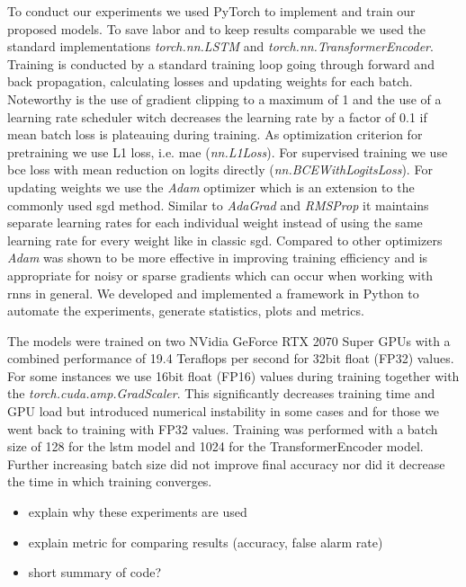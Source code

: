 To conduct our experiments we used PyTorch \cite{pytorch} to implement and train our proposed models. To save labor and to keep results comparable we used the standard implementations \textit{torch.nn.LSTM} and \textit{torch.nn.TransformerEncoder}. Training is conducted by a standard training loop going through forward and back propagation, calculating losses and updating weights for each batch. Noteworthy is the use of gradient clipping to a maximum of 1 and the use of a learning rate scheduler witch decreases the learning rate by a factor of 0.1 if mean batch loss is plateauing during training. As optimization criterion for pretraining we use L1 loss, i.e. \gls{mae} (\textit{nn.L1Loss}). For supervised training we use \gls{bce} loss with mean reduction on logits directly (\textit{nn.BCEWithLogitsLoss}).
For updating weights we use the \textit{Adam} optimizer \cite{adam} which is an extension to the commonly used \gls{sgd} method. Similar to \textit{AdaGrad} \cite{optimizer_comparison} and \textit{RMSProp} \cite{optimizer_comparison} it maintains separate learning rates for each individual weight instead of using the same learning rate for every weight like in classic \gls{sgd}. Compared to other optimizers \textit{Adam} was shown to be more effective in improving training efficiency \cite{adam} and is appropriate for noisy or sparse gradients which can occur when working with \glspl{rnn} in general.
We developed and implemented a framework in Python to automate the experiments, generate statistics, plots and metrics. \par
The models were trained on two NVidia GeForce RTX 2070 Super GPUs with a combined performance of 19.4 Teraflops per second for 32bit float (FP32) values. For some instances we use 16bit float (FP16) values during training together with the \textit{torch.cuda.amp.GradScaler}. This significantly decreases training time and GPU load but introduced numerical instability in some cases and for those we went back to training with FP32 values. Training was performed with a batch size of 128 for the \gls{lstm} model and 1024 for the TransformerEncoder model. Further increasing batch size did not improve final accuracy nor did it decrease the time in which training converges. \par

\begin{itemize}
	\item explain why these experiments are used
	\item explain metric for comparing results (accuracy, false alarm rate)
	\item short summary of code?
\end{itemize}

